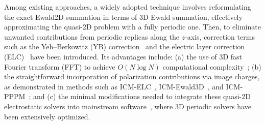 Among existing approaches, a widely adopted technique involves reformulating the exact Ewald2D summation in terms of 3D Ewald summation, effectively approximating the quasi-2D problem with a fully periodic one.
Then, to eliminate unwanted contributions from periodic replicas along the $z$-axis, correction terms such as the Yeh--Berkowitz (YB) correction~\cite{yeh1999ewald,dos2015electrolytes} and the electric layer correction (ELC)~\cite{arnold2002electrostatics,tyagi2008electrostatic} have been introduced.
Its advantages include: (a) the use of 3D fast Fourier transform (FFT) to achieve $ O(N\log N)$ computational complexity~\cite{yuan2021particle,huang2024pmc}; 
(b) the straightforward incorporation of polarization contributions via image charges, as demonstrated in methods such as ICM-ELC~\cite{tyagi2008electrostatic}, ICM-Ewald3D~\cite{dos2015electrolytes}, and ICM-PPPM~\cite{yuan2021particle}; 
and (c) the minimal modifications needed to integrate these quasi-2D electrostatic solvers into mainstream software~\cite{ABRAHAM201519,thompson2021lammps}, where 3D periodic solvers have been extensively optimized.



